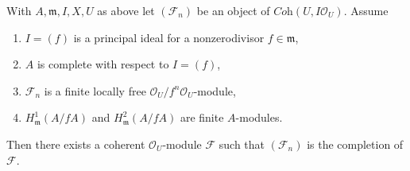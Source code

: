 \begin{lemma}
\label{lemma-algebraization-principal-variant}
With $A, \mathfrak m, I, X, U$ as above let
$(\mathcal{F}_n)$ be an object of $\textit{Coh}(U, I\mathcal{O}_U)$.
Assume
\begin{enumerate}
\item $I = (f)$ is a principal ideal for a nonzerodivisor $f \in \mathfrak m$,
\item $A$ is complete with respect to $I = (f)$,
\item $\mathcal{F}_n$ is a finite locally free
$\mathcal{O}_U/f^n\mathcal{O}_U$-module,
\item $H^1_\mathfrak m(A/fA)$ and $H^2_\mathfrak m(A/fA)$
are finite $A$-modules.
\end{enumerate}
Then there exists a coherent $\mathcal{O}_U$-module
$\mathcal{F}$ such that $(\mathcal{F}_n)$ is the completion of $\mathcal{F}$.
\end{lemma}

